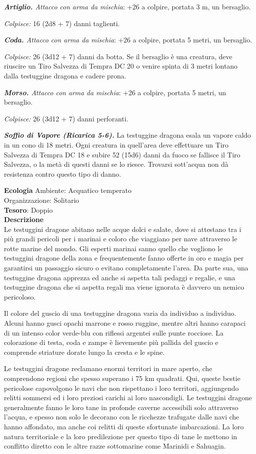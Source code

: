 \begin{multicols}{2}
\textit{\textbf{Artiglio.} Attacco con arma da mischia}: +26 a colpire, portata 3 m, un bersaglio.

\textit{Colpisce:} 16 (2d8 + 7) danni taglienti.

\textit{\textbf{Coda.} Attacco con arma da mischia}: +26 a colpire, portata 5 metri, un bersaglio.

\textit{Colpisce:} 26 (3d12 + 7) danni da botta. Se il bersaglio è una creatura, deve riuscire un Tiro Salvezza di Tempra DC 20 o venire spinta di 3 metri lontano dalla testuggine dragona e cadere prona.

\textit{\textbf{Morso.} Attacco con arma da mischia}: +26 a colpire, portata 5 metri, un bersaglio.

\textit{Colpisce:} 26 (3d12 + 7) danni perforanti.

\textit{\textbf{Soffio di Vapore (Ricarica 5-6).}} La testuggine dragona esala un vapore caldo in un cono di 18 metri. Ogni creatura in quell'area deve effettuare un Tiro Salvezza di Tempra DC 18 e subire 52 (15d6) danni da fuoco se fallisce il Tiro Salvezza, o la metà di questi danni se lo riesce. Trovarsi sott'acqua non dà resistenza contro questo tipo di danno.

\textbf{Ecologia}
Ambiente: Acquatico temperato\\
Organizzazione: Solitario\\
\textbf{Tesoro}: Doppio\\
\textbf{Descrizione}\\
Le testuggini dragone abitano nelle acque dolci e salate, dove si attestano tra i più grandi pericoli per i marinai e coloro che viaggiano per nave attraverso le rotte marine del mondo. Gli esperti marinai sanno quello che vogliono le testuggini dragone della zona e frequentemente fanno offerte in oro e magia per garantirsi un passaggio sicuro o evitano completamente l'area. Da parte sua, una testuggine dragona apprezza ed anche si aspetta tali pedaggi e regalie, e una testuggine dragona che si aspetta regali ma viene ignorata è davvero un nemico pericoloso.

Il colore del guscio di una testuggine dragona varia da individuo a individuo. Alcuni hanno gusci opachi marrone e rosso ruggine, mentre altri hanno carapaci di un intenso color verde-blu con riflessi argentei sulle punte rocciose. La colorazione di testa, coda e zampe è lievemente più pallida del guscio e comprende striature dorate lungo la cresta e le spine.

Le testuggini dragone reclamano enormi territori in mare aperto, che comprendono regioni che spesso superano i 75 km quadrati. Qui, queste bestie pericolose capovolgono le navi che non rispettano i loro territori, aggiungendo relitti sommersi ed i loro preziosi carichi ai loro nascondigli. Le testuggini dragone generalmente fanno le loro tane in profonde caverne accessibili solo attraverso l'acqua, e spesso non solo le decorano con le ricchezze trafugate dalle navi che hanno affondato, ma anche coi relitti di queste sfortunate imbarcazioni. La loro natura territoriale e la loro predilezione per questo tipo di tane le mettono in conflitto diretto con le altre razze sottomarine come Marinidi e Sahuagin.


\end{multicols}
